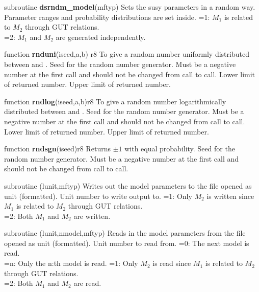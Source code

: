 \begin{sub}{subroutine \textbf{dsrndm\_model}(mftyp)}
   Sets the susy parameters in a random way.
    Parameter ranges and probability distributions are set inside.
     =1: $M_1$ is related to $M_2$ through GUT relations.\\
     =2: $M_1$ and $M_2$ are generated independently.
\end{sub}

\begin{sub}{function \textbf{rnduni}(iseed,a,b) \hfill r8}
   To give a random number uniformly
  distributed between  and .
   Seed for the random number generator. Must be a
  negative number at the first call and should not be changed from
  call to call.
   Lower limit of returned number.
   Upper limit of returned number.
\end{sub}

\begin{sub}{function \textbf{rndlog}(iseed,a,b)\hfill r8}
   To give a random number logarithmically
  distributed between  and .
   Seed for the random number generator. Must be a
  negative number at the first call and should not be changed from
  call to call.
   Lower limit of returned number.
   Upper limit of returned number.
\end{sub}

\begin{sub}{function \textbf{rndsgn}(iseed)\hfill r8}
   Returns $\pm1$ with equal probability.
   Seed for the random number generator. Must be a
  negative number at the first call and should not be changed from
  call to call.
\end{sub}

\begin{sub}{subroutine (lunit,mftyp)}
   Writes out the model parameters
  to the file opened as unit  (formatted). 
   Unit number to write output to.
     =1: Only $M_2$ is written since $M_1$ is related to $M_2$ through
         GUT relations.\\ 
     =2: Both $M_1$ and $M_2$ are written.
\end{sub}

\begin{sub}{subroutine (lunit,nmodel,mftyp)}
   Reads in the model parameters from the file opened
  as unit  (formatted).  
   Unit number to read from.
     =0: The next model is read.\\
     =n: Only the n:th model is read.
     =1: Only $M_2$ is read since $M_1$ is related to $M_2$ through
         GUT relations.\\ 
     =2: Both $M_1$ and $M_2$ are read.
\end{sub}

